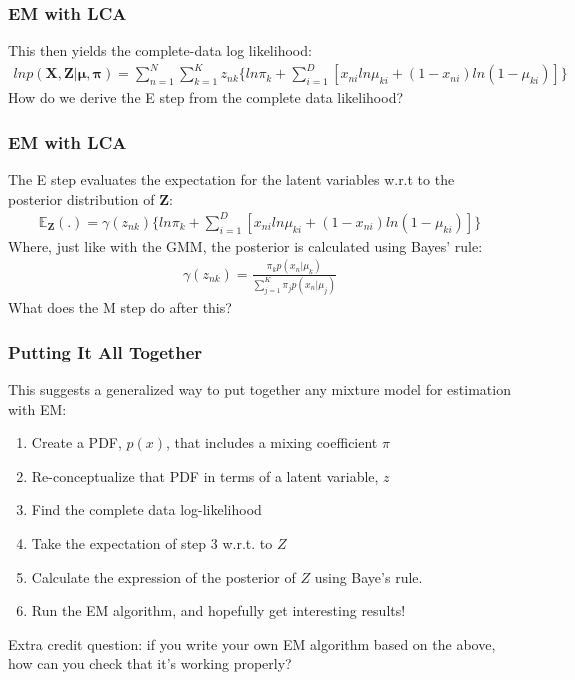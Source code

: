 \documentclass{beamer}
\begin{document}
\begin{frame}
\frametitle{EM with LCA}
	This then yields the complete-data log likelihood:
	\begin{align*}
	ln p(\mathbf{X}, \mathbf{Z}|\mathbf{\mu}, \mathbf{\pi}) = \sum_{n=1}^{N}\sum_{k=1}^{K} z_{nk} \{ln \pi_k + \sum_{i=1}^{D}[x_{ni} ln \mu_{ki} + (1 - x_{ni})ln(1-\mu_{ki})]\}
	\end{align*}
	How do we derive the E step from the complete data likelihood?
\end{frame}

\begin{frame}
\frametitle{EM with LCA}
	The E step evaluates the expectation for the latent variables w.r.t to the posterior distribution of $\mathbf{Z}$:
	\begin{align*}
	\mathbb{E}_{\mathbf{Z}}(.) = \gamma(z_{nk})\{ln \pi_k + \sum_{i=1}^{D}[x_{ni} ln \mu_{ki} + (1 - x_{ni})ln(1-\mu_{ki})]\}
	\end{align*}
	Where, just like with the GMM, the posterior is calculated using Bayes' rule:
	\begin{align*}
	\gamma(z_{nk}) =  \frac{\pi_k p(x_n|\mu_k)}{\sum_{j =1}^{K} \pi_j p(x_n | \mu_j)}
	\end{align*}
	What does the M step do after this?

\end{frame}

\begin{frame}
\frametitle{Putting It All Together}
This suggests a generalized way to put together any mixture model for estimation with EM:
\begin{enumerate}
	\item Create a PDF, $p(x)$, that includes a mixing coefficient $\pi$
	\item Re-conceptualize that PDF in terms of a latent variable, $z$
	\item Find the complete data log-likelihood
	\item Take the expectation of step 3 w.r.t.  to $Z$
	\item Calculate the expression of the posterior of $Z$ using Baye's rule.
	\item Run the EM algorithm, and hopefully get interesting results!
\end{enumerate}
Extra credit question: if you write your own EM algorithm based on the above, how can you check that it's working properly?
\end{frame}
\end{document}
